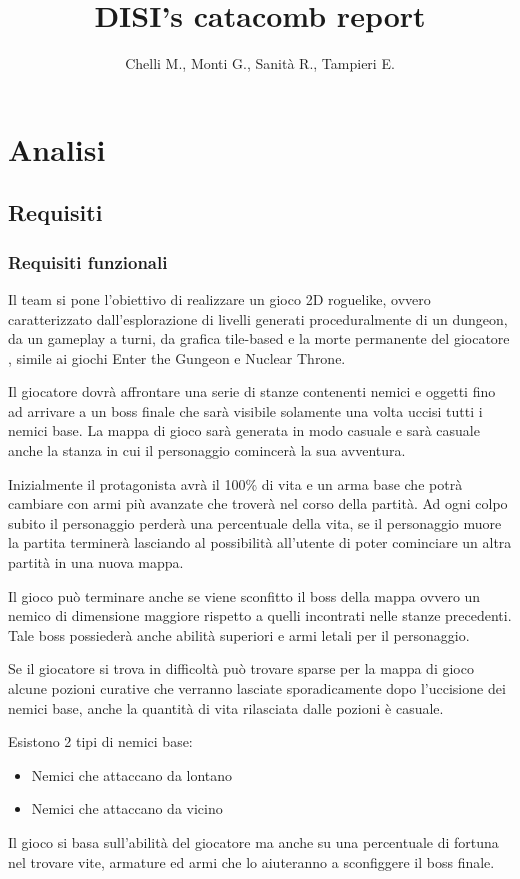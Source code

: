 \documentclass[a4paper,12pt]{report}
\title{DISI's catacomb report}
\author{Chelli M., Monti G., Sanità R., Tampieri E.}
\begin{document}
    \maketitle
    \tableofcontents
    \chapter{Analisi}
    \section{Requisiti}
    \subsection{Requisiti funzionali}
    \par Il team si pone l'obiettivo di realizzare un gioco 2D roguelike,
    ovvero caratterizzato dall'esplorazione di livelli generati proceduralmente
    di un dungeon, da un gameplay a turni, da grafica tile-based e la morte
    permanente del giocatore \cite{wiki:Roguelike}, simile ai giochi Enter the
    Gungeon e Nuclear Throne.
    \par Il giocatore dovrà affrontare una serie di stanze contenenti
    nemici e oggetti fino ad arrivare a un boss finale che sarà visibile solamente una volta uccisi tutti i nemici base.
    La mappa di gioco sarà generata in modo casuale e sarà casuale anche la stanza in cui il personaggio comincerà
    la sua avventura.
    \par Inizialmente il protagonista avrà il 100\% di vita e un arma base che potrà
    cambiare con armi più avanzate che troverà nel corso
    della partità. Ad ogni colpo subito il personaggio perderà una percentuale della
    vita, se il personaggio muore la partita terminerà lasciando al possibilità all'utente di
    poter cominciare un altra partità in una nuova mappa.
    \par Il gioco può terminare anche se viene sconfitto il boss della mappa ovvero
    un nemico di dimensione maggiore rispetto a quelli incontrati nelle stanze precedenti.
    Tale boss possiederà anche abilità superiori e armi letali per il personaggio.
    \par Se il giocatore si trova in difficoltà può trovare sparse per la mappa di gioco
    alcune pozioni curative che verranno lasciate sporadicamente dopo l'uccisione dei nemici base,
    anche la quantità di vita rilasciata dalle pozioni è casuale.
    \par Esistono 2 tipi di nemici base:
    \begin{itemize}
        \item Nemici che attaccano da lontano
        \item Nemici che attaccano da vicino
    \end{itemize}
    \par Il gioco si basa sull'abilità del giocatore ma anche su una percentuale di
    fortuna nel trovare vite, armature ed armi che lo aiuteranno a sconfiggere il
    boss finale.
\end{document}
